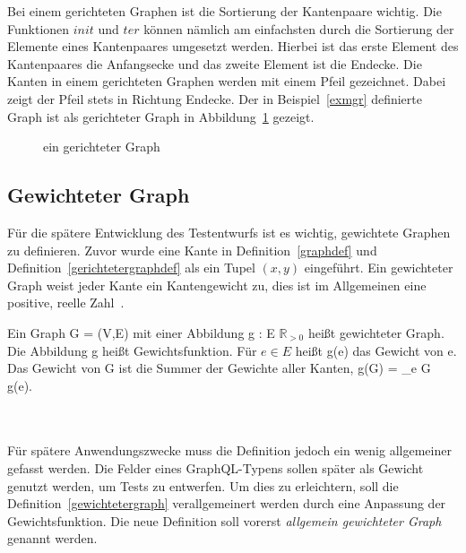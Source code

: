 Bei einem gerichteten Graphen ist die Sortierung der Kantenpaare wichtig.
Die Funktionen $init$ und $ter$ können nämlich am einfachsten durch die Sortierung der Elemente eines Kantenpaares umgesetzt werden.
Hierbei ist das erste Element des Kantenpaares die Anfangsecke und das zweite Element ist die Endecke.
Die Kanten in einem gerichteten Graphen werden mit einem Pfeil gezeichnet.
Dabei zeigt der Pfeil stets in Richtung Endecke.
Der in Beispiel~\ref{exmgr} definierte Graph ist als gerichteter Graph in Abbildung~\ref{graphexample} gezeigt.

\begin{figure}
    \begin{center}
    \end{center}
    \caption{ein gerichteter Graph}
    \label{graphexample}
\end{figure}

\subsection{Gewichteter Graph}

Für die spätere Entwicklung des Testentwurfs ist es wichtig, gewichtete Graphen zu definieren.
Zuvor wurde eine Kante in Definition~\ref{graphdef} und Definition~\ref{gerichtetergraphdef} als ein Tupel $(x, y)$ eingeführt.
Ein gewichteter Graph weist jeder Kante ein Kantengewicht zu, dies ist im Allgemeinen eine positive, reelle Zahl~\cite[vgl. S. 251]{graphentheorie3}.

\begin{definition}
    Ein Graph G = (V,E) mit einer Abbildung g : E \textrightarrow $\mathbb{R}_{>0}$ heißt gewichteter Graph.
    Die Abbildung g heißt Gewichtsfunktion. Für $e \in E$ heißt g(e) das Gewicht von e.
    Das Gewicht von G ist die Summer der Gewichte aller Kanten, g(G) = \sum_{e \in G} g(e).\\
    \cite[vgl.~Definition~6.1~S.~251]{graphentheorie3}
    \label{gewichtetergraph}
\end{definition}
\\
\\
Für spätere Anwendungszwecke muss die Definition jedoch ein wenig allgemeiner gefasst werden.
Die Felder eines GraphQL-Typens sollen später als Gewicht genutzt werden, um Tests zu entwerfen.
Um dies zu erleichtern, soll die Definition~\ref{gewichtetergraph} verallgemeinert werden durch eine Anpassung der Gewichtsfunktion.
Die neue Definition soll vorerst \textit{allgemein gewichteter Graph} genannt werden.

